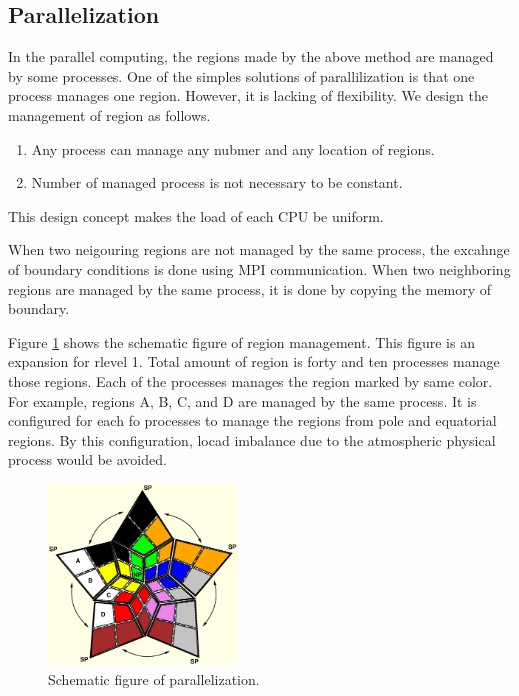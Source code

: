 \subsection{Parallelization}
In the parallel computing, the regions made by the above method are managed by
some processes. One of the simples solutions of parallilization is that one
process manages one region. However, it is lacking of flexibility. We design
the management of region as follows.
\begin{enumerate}
  \item Any process can manage any nubmer and any location of regions.
  \item Number of managed process is not necessary to be constant.
\end{enumerate}
This design concept makes the load of each CPU be uniform.

When two neigouring regions are not managed by the same process, the excahnge
of boundary conditions is done using MPI communication. When two neighboring
regions are managed by the same process, it is done by copying the memory of
boundary.

Figure \ref{fig:scale-gm_parallel} shows the schematic figure of region management. This figure is an
expansion for rlevel 1. Total amount of region is forty and ten processes
manage those regions. Each of the processes manages the region marked by same
color. For example, regions A, B, C, and D are managed by the same process. It
is configured for each fo processes to manage the regions from pole and
equatorial regions. By this configuration, locad imbalance due to the
atmospheric physical process would be avoided.

\begin{figure}[H]
  \begin{center}
    \includegraphics[width=5cm]{figure/parallel}
    \caption{Schematic figure of parallelization.}
    \label{fig:scale-gm_parallel}
  \end{center}
\end{figure}




